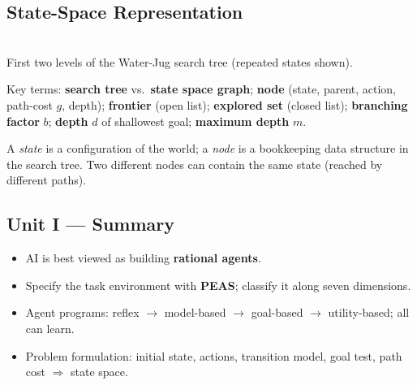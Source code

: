 \subsection{State-Space Representation}
\begin{center}
\\[2pt]{\small\color{slate} First two levels of the Water-Jug search tree (repeated states shown).}
\end{center}
Key terms: \textbf{search tree} vs.\ \textbf{state space graph}; \textbf{node} (state, parent, action, path-cost $g$, depth); \textbf{frontier} (open list); \textbf{explored set} (closed list); \textbf{branching factor} $b$; \textbf{depth} $d$ of shallowest goal; \textbf{maximum depth} $m$.

\begin{caution}
A \emph{state} is a configuration of the world; a \emph{node} is a bookkeeping data structure in the search tree. Two different nodes can contain the same state (reached by different paths).
\end{caution}

\subsection*{Unit I --- Summary}
\begin{itemize}
\item AI is best viewed as building \textbf{rational agents}.
\item Specify the task environment with \textbf{PEAS}; classify it along seven dimensions.
\item Agent programs: reflex $\rightarrow$ model-based $\rightarrow$ goal-based $\rightarrow$ utility-based; all can learn.
\item Problem formulation: initial state, actions, transition model, goal test, path cost $\Rightarrow$ state space.
\end{itemize}




